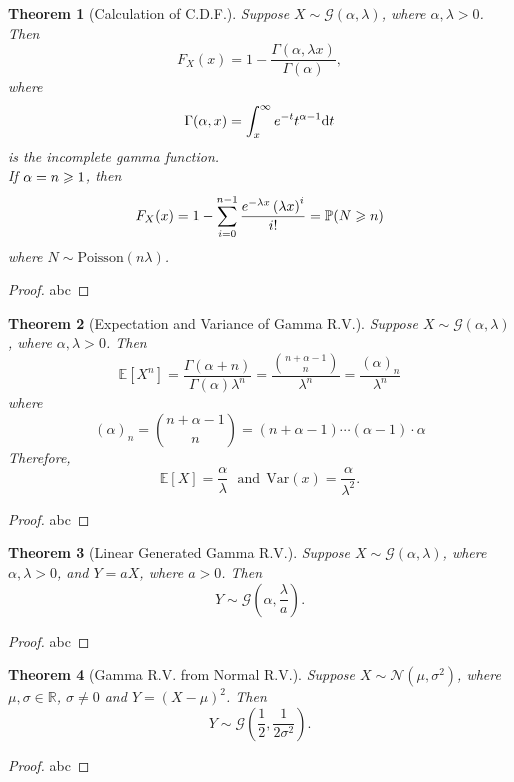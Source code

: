 \documentclass[openany,12pt]{book}
\newtheorem{theorem}{Theorem}[chapter]
\begin{document}
\begin{theorem}[Calculation of C.D.F.]
Suppose $X\sim\mathcal{G}(\alpha,\lambda)$, where $\alpha,\lambda>0$. Then
$$
F_X(x)=1-\frac{{\Gamma}(\alpha,\lambda x)}{{\Gamma}(\alpha)},
$$
where
$$
{\Gamma}(\alpha,x)=\int_{x}^{\infty}{e^{-t}t^{\alpha-1}\mathrm{d} t}
$$
is the incomplete gamma function.\\
If $\alpha=n\geqslant1$, then
$$
F_X(x)=1-\sum_{i=0}^{n-1}\frac{e^{-\lambda x}\left(\lambda x\right)^i}{i!}=\mathbb{P}(N\geqslant n)
$$
where $N\sim\mathrm{Poisson}(n\lambda)$.
\end{theorem}

\begin{proof}
  abc
\end{proof}

\begin{theorem}[Expectation and Variance of Gamma R.V.]
Suppose $X\sim\mathcal{G}(\alpha,\lambda)$, where $\alpha,\lambda>0$. Then
$$
\mathbb{E}\left[X^n\right]=\frac{{\Gamma}(\alpha+n)}{{\Gamma}(\alpha)\lambda^n}=\frac{\binom{n+\alpha-1}{n}}{\lambda^n}=\frac{{(\alpha)}_n}{\lambda^n}
$$
where
$$
{(\alpha)}_n=\binom{n+\alpha-1}{n}=\left(n+\alpha-1\right)\cdots\left(\alpha-1\right)\cdot\alpha
$$
Therefore,
\[\mathbb{E}[ X] = \frac{\alpha}{\lambda}\text{\ \ }\mathrm{\text{and}}\mathrm{\ }\ \mathrm{Var}(x) = \frac{\alpha}{\lambda^{2}}.
\]
\end{theorem}

\begin{proof}
  abc
\end{proof}

\begin{theorem}[Linear Generated Gamma R.V.]
Suppose $X\sim\mathcal{G}(\alpha,\lambda)$, where $\alpha,\lambda>0$, and $Y=aX$, where $a>0$. Then
\[Y\sim\mathcal{G}\left( \alpha,\frac{\lambda}{a} \right).\]
\end{theorem}

\begin{proof}
  abc
\end{proof}

\begin{theorem}[Gamma R.V. from Normal R.V.]
Suppose $X\sim \mathcal{N}(\mu,\sigma^2)$, where $\mu,\sigma\in\mathbb{R}$, $\sigma\neq0$ and $Y={(X-\mu)}^2$. Then
\[Y\sim\mathcal{G}\left( \frac{1}{2},\frac{1}{2\sigma^{2}} \right).\]
\end{theorem}

\begin{proof}
  abc
\end{proof}
\end{document}
